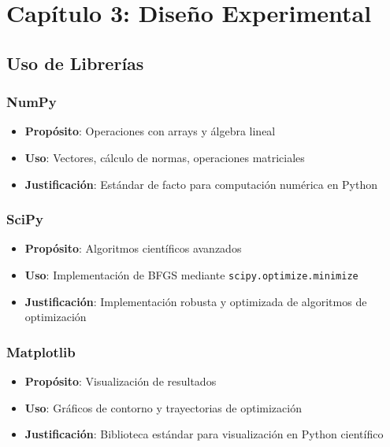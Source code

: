 \documentclass[12pt,a4paper]{article}
\begin{document}
\newpage

\section*{Capítulo 3: Diseño Experimental}

\subsection*{Uso de Librerías}

\subsubsection*{NumPy}

\begin{itemize}
    \item \textbf{Propósito}: Operaciones con arrays y álgebra lineal
    \item \textbf{Uso}: Vectores, cálculo de normas, operaciones matriciales
    \item \textbf{Justificación}: Estándar de facto para computación numérica en Python
\end{itemize}

\subsubsection*{SciPy}

\begin{itemize}
    \item \textbf{Propósito}: Algoritmos científicos avanzados
    \item \textbf{Uso}: Implementación de BFGS mediante \texttt{scipy.optimize.minimize}
    \item \textbf{Justificación}: Implementación robusta y optimizada de algoritmos de optimización
\end{itemize}

\subsubsection*{Matplotlib}

\begin{itemize}
    \item \textbf{Propósito}: Visualización de resultados
    \item \textbf{Uso}: Gráficos de contorno y trayectorias de optimización
    \item \textbf{Justificación}: Biblioteca estándar para visualización en Python científico
\end{itemize}
\end{document}
